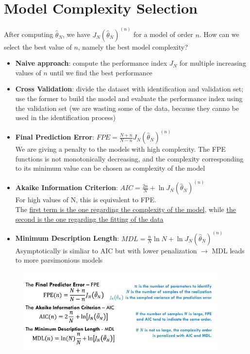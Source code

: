 \documentclass[10pt,a4paper]{article}
\begin{document}
\section{Model Complexity Selection}
After computing $\hat{\theta}_N$, we have $J_N(\hat{\theta}_N)^{(n)}$ for a model of order $n$. How can we select the best value of $n$, namely the best model complexity?
\begin{itemize}
	\item \textbf{Naive approach}: compute the performance index $J_N$ for multiple increasing values of $n$ until we find the best performance
	\item \textbf{Cross Validation}: divide the dataset with identification and validation set; use the former to build the model and evaluate the performance index using the validation set (we are wasting some of the data, because they canno be used in the identification process)
	\item \textbf{Final Prediction Error}: $FPE=\frac{N+n}{N-n}J_N(\hat{\theta}_N)^{(n)}$ \\
	We are giving a penalty to the models with high complexity. The FPE functions is not monotonically decreasing, and the complexity corresponding to its minimum value can be chosen as complexity of the model
	\item \textbf{Akaike Information Criterion}: $AIC=\frac{2n}{N}+\ln{J_N(\hat{\theta}_N)^{(n)}}$ \\ For high values of N, this is equivalent to FPE. \\ The \uline{first term is the one regarding the complexity of the model}, while \uline{the second is the one regarding the fitting of the data}
	\item \textbf{Minimum Description Length}: $MDL=\frac{n}{N}\ln{N}+\ln{J_N(\hat{\theta}_N)^{(n)}}$ \\
	Asymptotically is simliar to AIC but with lower penalization $\rightarrow$ MDL leads to more parsimonious models
\end{itemize}
 \begin{figure}[h!]
 \hfill \includegraphics[width=300pt]{images/summary-criterion.png}\hspace*{\fill}
  \label{fig:summary-criterion}
\end{figure}
\pagebreak
\end{document}
